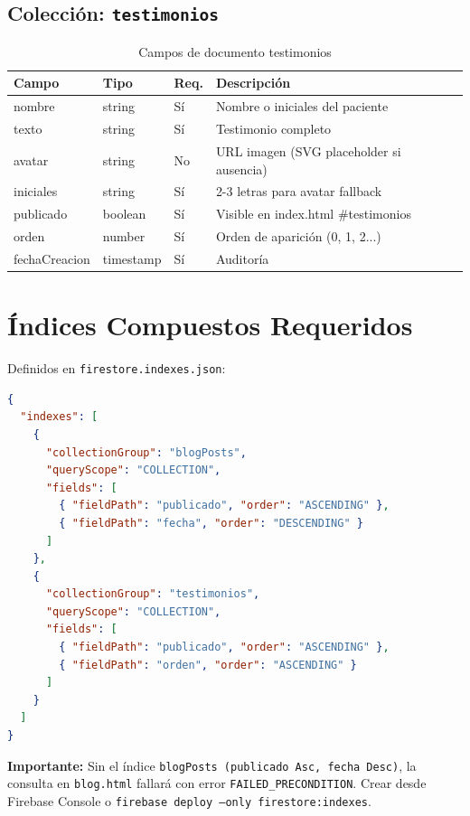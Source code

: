 \documentclass[12pt,a4paper,spanish]{report}
\begin{document}
\subsection{Colección: \texttt{testimonios}}
\begin{table}[H]
    \centering
    \caption{Campos de documento testimonios}
    \label{tab:testimonios}
    \begin{tabular}{lllp{5cm}}
        \toprule
        \textbf{Campo} & \textbf{Tipo} & \textbf{Req.} & \textbf{Descripción} \\
        \midrule
        nombre & string & Sí & Nombre o iniciales del paciente \\
        texto & string & Sí & Testimonio completo \\
        avatar & string & No & URL imagen (SVG placeholder si ausencia) \\
        iniciales & string & Sí & 2-3 letras para avatar fallback \\
        publicado & boolean & Sí & Visible en index.html \#testimonios \\
        orden & number & Sí & Orden de aparición (0, 1, 2...) \\
        fechaCreacion & timestamp & Sí & Auditoría \\
        \bottomrule
    \end{tabular}
\end{table}

\section{Índices Compuestos Requeridos}
Definidos en \texttt{firestore.indexes.json}:

\begin{lstlisting}[language=JSON, caption={firestore.indexes.json}]
{
  "indexes": [
    {
      "collectionGroup": "blogPosts",
      "queryScope": "COLLECTION",
      "fields": [
        { "fieldPath": "publicado", "order": "ASCENDING" },
        { "fieldPath": "fecha", "order": "DESCENDING" }
      ]
    },
    {
      "collectionGroup": "testimonios",
      "queryScope": "COLLECTION",
      "fields": [
        { "fieldPath": "publicado", "order": "ASCENDING" },
        { "fieldPath": "orden", "order": "ASCENDING" }
      ]
    }
  ]
}
\end{lstlisting}

\textbf{Importante:} Sin el índice \texttt{blogPosts (publicado Asc, fecha Desc)}, la consulta en \texttt{blog.html} fallará con error \texttt{FAILED\_PRECONDITION}. Crear desde Firebase Console o \texttt{firebase deploy --only firestore:indexes}.
\end{document}
